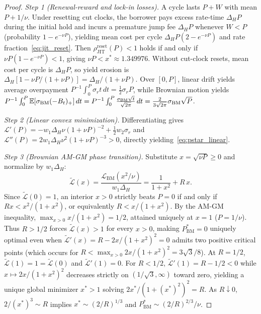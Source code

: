 \begin{proof}
\emph{Step 1 (Renewal-reward and lock-in losses).} A cycle lasts $P + W$ with mean $P + 1/\nu$. Under resetting cut clocks, the borrower pays excess rate-time $\Delta_H P$ during the initial hold and incurs a premature jump fee $\Delta_H P$ whenever $W < P$ (probability $1 - e^{-\nu P}$), yielding mean cost per cycle $\Delta_H P(2 - e^{-\nu P})$ and rate fraction~\eqref{eq:jit_reset}. Then $\rho_{\mathrm{JIT}}^{\mathrm{reset}}(P) < 1$ holds if and only if $\nu P(1 - e^{-\nu P}) < 1$, giving $\nu P < x^* \approx 1.349976$. Without cut-clock resets, mean cost per cycle is $\Delta_H P$, so yield erosion is $\Delta_H[1 - \nu P/(1 + \nu P)] = \Delta_H/(1 + \nu P)$. Over $[0, P]$, linear drift yields average overpayment $P^{-1}\int_0^P \sigma_r t\,dt = \frac{1}{2}\sigma_r P$, while Brownian motion yields $P^{-1}\int_0^P \mathbb{E}[\sigma_{\mathrm{BM}}(-B_t)_+]\,dt = P^{-1}\int_0^P \frac{\sigma_{\mathrm{BM}}\sqrt{t}}{\sqrt{2\pi}}\,dt = \frac{2}{3\sqrt{2\pi}}\sigma_{\mathrm{BM}}\sqrt{P}$.

\emph{Step 2 (Linear convex minimization).} Differentiating gives $\mathcal{L}'(P) = -w_1 \Delta_H \nu(1 + \nu P)^{-2} + \frac{1}{2}w_2 \sigma_r$ and $\mathcal{L}''(P) = 2 w_1 \Delta_H \nu^2 (1 + \nu P)^{-3} > 0$, directly yielding~\eqref{eq:pstar_linear}.

\emph{Step 3 (Brownian AM-GM phase transition).} Substitute $x = \sqrt{\nu P} \ge 0$ and normalize by $w_1 \Delta_H$:
\[
\tilde{\mathcal{L}}(x) = \frac{\mathcal{L}_{\mathrm{BM}}(x^2/\nu)}{w_1 \Delta_H} = \frac{1}{1 + x^2} + R\,x.
\]
Since $\tilde{\mathcal{L}}(0) = 1$, an interior $x > 0$ strictly beats $P = 0$ if and only if $R x < x^2 / (1 + x^2)$, or equivalently $R < x/(1 + x^2)$. By the AM-GM inequality, $\max_{x > 0} x/(1 + x^2) = 1/2$, attained uniquely at $x = 1$ ($P = 1/\nu$). Thus $R > 1/2$ forces $\tilde{\mathcal{L}}(x) > 1$ for every $x > 0$, making $P^*_{\mathrm{BM}} = 0$ uniquely optimal even when $\tilde{\mathcal{L}}'(x) = R - 2x/(1 + x^2)^2 = 0$ admits two positive critical points (which occurs for $R < \max_{x>0} 2x/(1 + x^2)^2 = 3\sqrt{3}/8$). At $R = 1/2$, $\tilde{\mathcal{L}}(1) = 1 = \tilde{\mathcal{L}}(0)$ and $\tilde{\mathcal{L}}'(1) = 0$. For $R < 1/2$, $\tilde{\mathcal{L}}'(1) = R - 1/2 < 0$ while $x \mapsto 2x/(1 + x^2)^2$ decreases strictly on $(1/\sqrt{3}, \infty)$ toward zero, yielding a unique global minimizer $x^* > 1$ solving $2x^*/(1 + (x^*)^2)^2 = R$. As $R \downarrow 0$, $2/(x^*)^3 \sim R$ implies $x^* \sim (2/R)^{1/3}$ and $P^*_{\mathrm{BM}} \sim (2/R)^{2/3}/\nu$.
\end{proof}

